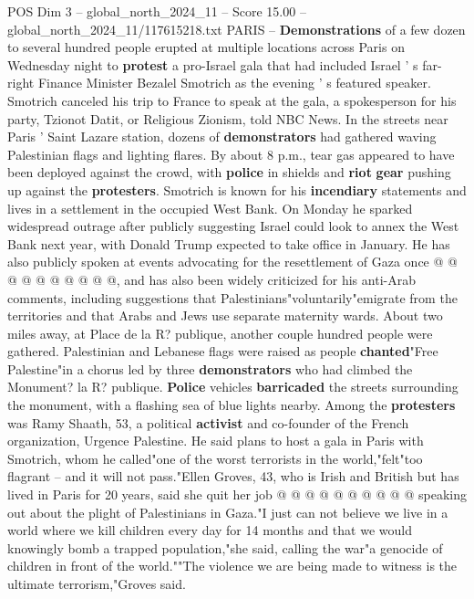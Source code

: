 \begin{textsample}{POS Dim 3 – global\_north\_2024\_11 – Score 15.00 – global\_north\_2024\_11/117615218.txt}  \label{ex:f3_pos_182}
PARIS -- \textbf{Demonstrations} of a few dozen to several hundred people erupted at multiple locations across Paris on Wednesday night to \textbf{protest} a pro-Israel gala that had included Israel ' s far-right Finance Minister Bezalel Smotrich as the evening ' s featured speaker.
Smotrich canceled his trip to France to speak at the gala, a spokesperson for his party, Tzionot Datit, or Religious Zionism, told NBC News.
In the streets near Paris ' Saint Lazare station, dozens of \textbf{demonstrators} had gathered waving Palestinian flags and lighting flares.
By about 8 p.m., tear gas appeared to have been deployed against the crowd, with \textbf{police} in shields and \textbf{riot} \textbf{gear} pushing up against the \textbf{protesters}.
Smotrich is known for his \textbf{incendiary} statements and lives in a settlement in the occupied West Bank.
On Monday he sparked widespread outrage after publicly suggesting Israel could look to annex the West Bank next year, with Donald Trump expected to take office in January.
He has also publicly spoken at events advocating for the resettlement of Gaza once @ @ @ @ @ @ @ @ @ @, and has also been widely criticized for his anti-Arab comments, including suggestions that Palestinians"voluntarily"emigrate from the territories and that Arabs and Jews use separate maternity wards.
About two miles away, at Place de la R? publique, another couple hundred people were gathered.
Palestinian and Lebanese flags were raised as people \textbf{chanted}"Free Palestine"in a chorus led by three \textbf{demonstrators} who had climbed the Monument? la R? publique. \textbf{Police} vehicles \textbf{barricaded} the streets surrounding the monument, with a flashing sea of blue lights nearby.
Among the \textbf{protesters} was Ramy Shaath, 53, a political \textbf{activist} and co-founder of the French organization, Urgence Palestine.
He said plans to host a gala in Paris with Smotrich, whom he called"one of the worst terrorists in the world,"felt"too flagrant -- and it will not pass."Ellen Groves, 43, who is Irish and British but has lived in Paris for 20 years, said she quit her job @ @ @ @ @ @ @ @ @ @ speaking out about the plight of Palestinians in Gaza."I just can not believe we live in a world where we kill children every day for 14 months and that we would knowingly bomb a trapped population,"she said, calling the war"a genocide of children in front of the world.""The violence we are being made to witness is the ultimate terrorism,"Groves said.

\end{textsample}
